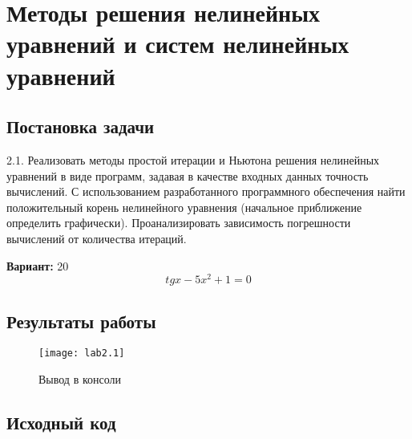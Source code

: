 \section{Методы решения нелинейных уравнений и систем нелинейных уравнений}

\subsection{Постановка задачи}
2.1. Реализовать методы простой итерации и Ньютона решения нелинейных уравнений в виде программ, задавая в качестве входных данных точность вычислений. С использованием разработанного программного обеспечения найти положительный корень нелинейного уравнения (начальное приближение определить графически). Проанализировать зависимость погрешности вычислений от количества итераций. 

{\bfseries Вариант:} 20
    \begin{equation}
        tgx- 5x^2 + 1 = 0
    \end{equation}
\pagebreak

\subsection{Результаты работы}
\begin{figure}[h!]
\centering
\texttt{[image: lab2.1]}
\caption{Вывод в консоли}
\end{figure}


\subsection{Исходный код}


\pagebreak